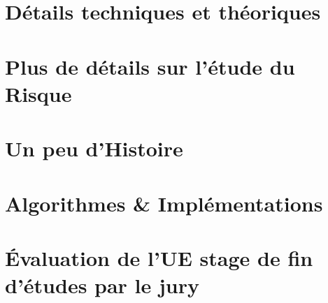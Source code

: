 \chapter{Détails techniques et théoriques}



\chapter{Plus de détails sur l'étude du Risque}


\chapter{Un peu d'Histoire}
\label{annexe:histoire}

\pagebreak


\chapter{Algorithmes \& Implémentations}

\chapter{Évaluation de l'UE stage de fin d'études par le jury}





